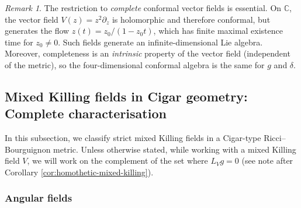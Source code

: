 \documentclass{article}
\theoremstyle{definition}
\theoremstyle{remark}
\newtheorem{remark}{Remark}[section]
\begin{document}
\begin{remark}
The restriction to \emph{complete} conformal vector fields is essential. 
On $\mathbb{C}$, the vector field $V(z) = z^2 \partial_z$ is holomorphic 
and therefore conformal, but generates the flow $z(t) = z_0/(1-z_0 t)$, 
which has finite maximal existence time for $z_0 \neq 0$. Such fields 
generate an infinite-dimensional Lie algebra.
Moreover, completeness is an \emph{intrinsic} property of the vector 
field (independent of the metric), so the four-dimensional conformal 
algebra is the same for $g$ and $\delta$.
\end{remark}


\subsection{Mixed Killing fields in  Cigar geometry:  Complete characterisation}
In this subsection, we classify strict
mixed Killing fields in a Cigar-type Ricci--Bourguignon metric.
Unless otherwise stated, while working with a mixed Killing field
$V$, we will work on the complement of the set where 
$L_{V} g = 0$ (see note after Corollary \ref{cor:homothetic-mixed-killing}).

\subsubsection{Angular fields}
\end{document}
